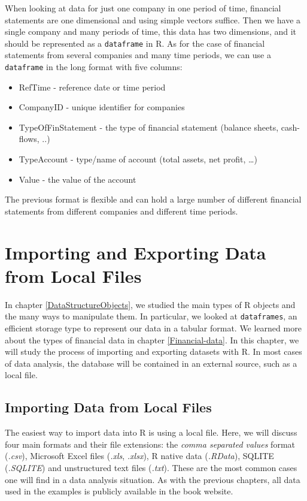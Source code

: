 \documentclass[11pt,]{book}
\providecommand{\tightlist}{%
  \setlength{\itemsep}{0pt}\setlength{\parskip}{0pt}}
\begin{document}
When looking at data for just one company in one period of time,
financial statements are one dimensional and using simple vectors
suffice. Then we have a single company and many periods of time, this
data has two dimensions, and it should be represented as a
\texttt{dataframe} in R. As for the case of financial statements from
several companies and many time periods, we can use a \texttt{dataframe}
in the long format with five columns:

\begin{itemize}
\tightlist
\item
  RefTime - reference date or time period
\item
  CompanyID - unique identifier for companies
\item
  TypeOfFinStatement - the type of financial statement (balance sheets,
  cash-flows, ..)
\item
  TypeAccount - type/name of account (total assets, net profit,
  \ldots{})
\item
  Value - the value of the account
\end{itemize}

The previous format is flexible and can hold a large number of different
financial statements from different companies and different time
periods.

\hypertarget{importing}{\chapter{Importing and Exporting Data from Local
Files}\label{importing}}

In chapter \ref{DataStructureObjects}, we studied the main types of R
objects and the many ways to manipulate them. In particular, we looked
at \texttt{dataframes}, an efficient storage type to represent our data
in a tabular format. We learned more about the types of financial data
in chapter \ref{Financial-data}. In this chapter, we will study the
process of importing and exporting datasets with R. In most cases of
data analysis, the database will be contained in an external source,
such as a local file.

\section{Importing Data from Local
Files}\label{importing-data-from-local-files}

The easiest way to import data into R is using a local file. Here, we
will discuss four main formats and their file extensions: the
\emph{comma separated values} format (\emph{.csv}), Microsoft Excel
files (\emph{.xls}, \emph{.xlsx}), R native data (\emph{.RData}), SQLITE
(\emph{.SQLITE}) and unstructured text files (\emph{.txt}). These are
the most common cases one will find in a data analysis situation. As
with the previous chapters, all data used in the examples is publicly
available in the book website.
\end{document}
